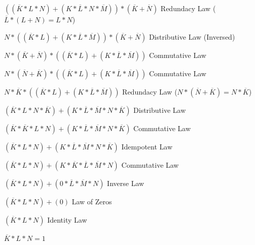 \documentclass{article}
\newcommand{\boxedanswer}[1]{%

    \fbox{\large\textbf{#1}}%
}
\begin{document}
    $((\overline{K} * L * N) + (K * \overline{L}* N *\overline{M})) * (\overline{K} + \overline{N})$ \hspace*{0.1in} Redundacy Law ($\overline{L} * (L+N) = L * N$) 

    $N * ((\overline{K} * L) + (K * \overline{L} *\overline{M})) * (\overline{K} + \overline{N})$ \hspace*{0.1in} Distributive Law (Inversed)

    $N * (\overline{K} + \overline{N}) * ((\overline{K} * L) + (K * \overline{L} *\overline{M}))$ \hspace*{0.1in} Commutative Law

    $N * (\overline{N} + \overline{K}) * ((\overline{K} * L) + (K * \overline{L} *\overline{M}))$ \hspace*{0.1in} Commutative Law

    $N * \overline{K} * ((\overline{K} * L) + (K * \overline{L} *\overline{M}))$ \hspace*{0.1in} Redundacy Law ($N * (\overline{N} + \overline{K}) = N * \overline{K}$)

    $(\overline{K} * L * N * \overline{K} ) + (K * \overline{L} *\overline{M} * N * \overline{K} )$ \hspace*{0.1in} Distributive Law

    $(\overline{K} * \overline{K} * L * N ) + (K * \overline{L} *\overline{M} * N * \overline{K} )$ \hspace*{0.1in} Commutative Law

    $(\overline{K} * L * N ) + (K * \overline{L} *\overline{M} * N * \overline{K} )$ \hspace*{0.1in} Idempotent Law

    $(\overline{K} * L * N ) + (K * \overline{K}  * \overline{L} *\overline{M} * N)$ \hspace*{0.1in} Commutative Law

    $(\overline{K} * L * N ) + (0 * \overline{L} *\overline{M} * N)$ \hspace*{0.1in} Inverse Law

    $(\overline{K} * L * N ) + (0)$ \hspace*{0.1in} Law of Zeros

    $(\overline{K} * L * N )$ \hspace*{0.1in} Identity Law

    $\overline{K} * L * N = 1$ 

    \boxedanswer{K = 0, L = 1, N = 1, M = 0 or 1}

    \newpage
\end{document}
